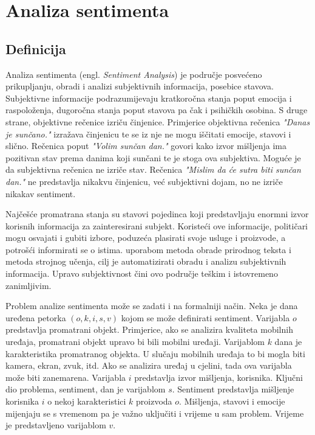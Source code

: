 \documentclass[times, utf8, zavrsni, numeric]{fer}
\begin{document}
\chapter{Analiza sentimenta} \label{sentiment}

\section{Definicija} \label{def}
Analiza sentimenta (engl. \textit{Sentiment Analysis}) je područje posvećeno 
prikupljanju, obradi i analizi subjektivnih informacija, posebice stavova.
Subjektivne informacije podrazumijevaju kratkoročna stanja poput emocija i raspoloženja,
dugoročna stanja poput stavova pa čak i psihičkih osobina.
S druge strane, objektivne rečenice izriču činjenice. 
Primjerice objektivna rečenica \textit{"Danas je sunčano."} izražava činjenicu te se iz nje ne mogu 
iščitati emocije, stavovi i slično. 
Rečenica poput \textit{"Volim sunčan dan."} govori kako izvor mišljenja ima pozitivan stav prema danima koji
sunčani te je stoga ova subjektiva.
Moguće je da subjektivna rečenica ne izriče stav. 
Rečenica \textit{"Mislim da će sutra biti sunčan dan."} ne predstavlja nikakvu činjenicu, već subjektivni dojam,
no ne izriče nikakav sentiment. 

\par Najčešće promatrana stanja su stavovi pojedinca koji predstavljaju enormni izvor korisnih 
informacija za zainteresirani subjekt.
Koristeći ove informacije, političari mogu osvajati i gubiti izbore, poduzeća plasirati
svoje usluge i proizvode, a potrošći informirati se o istima.
uporabom metoda obrade prirodnog teksta i metoda strojnog učenja, cilj je automatizirati
obradu i analizu subjektivnih informacija.
Upravo subjektivnost čini ovo područje teškim i istovremeno zanimljivim.

\par Problem analize sentimenta može se zadati i na formalniji način.
Neka je dana uređena petorka $(o, k, i, s, v)$ kojom se može definirati sentiment.
Varijabla $o$ predstavlja promatrani objekt. 
Primjerice, ako se analizira kvaliteta mobilnih uređaja, promatrani objekt upravo 
bi bili mobilni uređaji. Varijablom $k$ dana je karakteristika promatranog objekta. 
U slučaju mobilnih uređaja to bi mogla biti kamera, ekran, zvuk, itd.
Ako se analizira uređaj u cjelini, tada ova varijabla može biti zanemarena.
Varijabla $i$ predstavlja izvor mišljenja, korisnika.
Ključni dio problema, sentiment, dan je varijablom $s$. 
Sentiment predstavlja mišljenje korisnika $i$ o nekoj karakteristici $k$ proizvoda $o$.
Mišljenja, stavovi i emocije mijenjaju se s vremenom pa je važno uključiti i vrijeme u sam
problem. 
Vrijeme je predstavljeno varijablom $v$.
\end{document}
